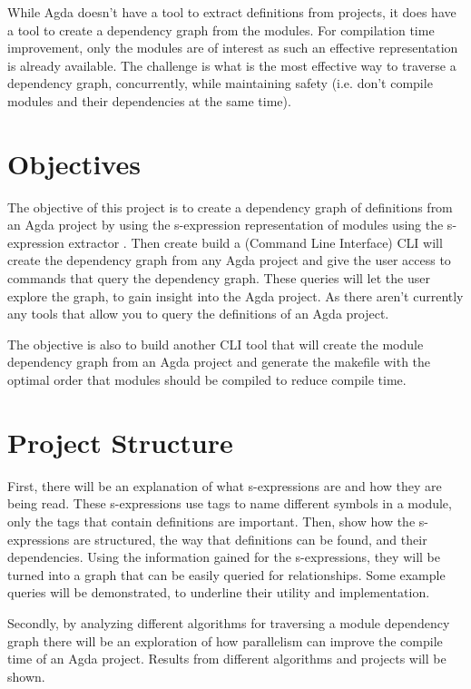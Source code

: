 While Agda doesn't have a tool to extract definitions from projects, it does
have a tool to create a dependency graph from the modules. For compilation time
improvement, only the modules are of interest as such an effective
representation is already available. The challenge is what is the most
effective way to traverse a dependency graph, concurrently, while maintaining
safety (i.e. don't compile modules and their dependencies at the same time). 


\section{Objectives}

The objective of this project is to create a dependency graph of definitions
from an Agda project by using the s-expression representation of modules using
the s-expression extractor \cite{andrej}. Then create build a (Command Line
Interface) CLI will create the dependency graph from any Agda project and
give the user access to commands that query the dependency graph. These queries
will let the user explore the graph, to gain insight into the Agda
project. As there aren't currently any tools that allow you to query the
definitions of an Agda project. 

The objective is also to build another CLI tool that will create the module
dependency graph from an Agda project and generate the makefile with the
optimal order that modules should be compiled to reduce compile time.

\section{Project Structure}

First, there will be an explanation of what s-expressions are and how they are
being read. These s-expressions use tags to name different symbols in a module,
only the tags that contain definitions are important. Then, show how the
s-expressions are structured, the way that definitions can be found, and   
their dependencies. Using the information gained for the s-expressions, they
will be turned into a graph that can be easily queried for relationships. Some
example queries will be demonstrated, to underline their utility and
implementation.

Secondly, by analyzing different algorithms for traversing a module dependency
graph there will be an exploration of how parallelism can improve the compile time
of an Agda project. Results from different algorithms and projects will be
shown.
